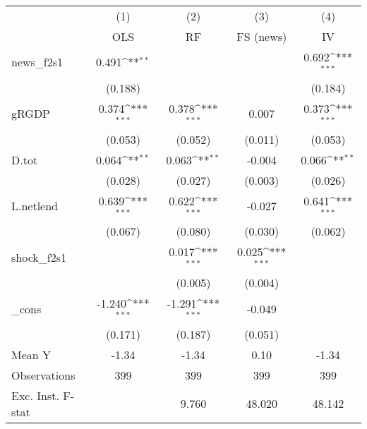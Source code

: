 {
\def\sym#1{\ifmmode^{#1}\else\(^{#1}\)\fi}
\begin{tabular}{l*{4}{c}}
\toprule
            &\multicolumn{1}{c}{(1)}&\multicolumn{1}{c}{(2)}&\multicolumn{1}{c}{(3)}&\multicolumn{1}{c}{(4)}\\
            &\multicolumn{1}{c}{OLS}&\multicolumn{1}{c}{RF}&\multicolumn{1}{c}{FS (news)}&\multicolumn{1}{c}{IV}\\
\midrule
news\_f2s1   &       0.491\sym{**} &                     &                     &       0.692\sym{***}\\
            &     (0.188)         &                     &                     &     (0.184)         \\
\addlinespace
gRGDP       &       0.374\sym{***}&       0.378\sym{***}&       0.007         &       0.373\sym{***}\\
            &     (0.053)         &     (0.052)         &     (0.011)         &     (0.053)         \\
\addlinespace
D.tot       &       0.064\sym{**} &       0.063\sym{**} &      -0.004         &       0.066\sym{**} \\
            &     (0.028)         &     (0.027)         &     (0.003)         &     (0.026)         \\
\addlinespace
L.netlend   &       0.639\sym{***}&       0.622\sym{***}&      -0.027         &       0.641\sym{***}\\
            &     (0.067)         &     (0.080)         &     (0.030)         &     (0.062)         \\
\addlinespace
shock\_f2s1  &                     &       0.017\sym{***}&       0.025\sym{***}&                     \\
            &                     &     (0.005)         &     (0.004)         &                     \\
\addlinespace
\_cons      &      -1.240\sym{***}&      -1.291\sym{***}&      -0.049         &                     \\
            &     (0.171)         &     (0.187)         &     (0.051)         &                     \\
\midrule
Mean Y      &       -1.34         &       -1.34         &        0.10         &       -1.34         \\
Observations&         399         &         399         &         399         &         399         \\
Exc. Inst. F-stat&                     &       9.760         &      48.020         &      48.142         \\
\bottomrule
\end{tabular}
}
